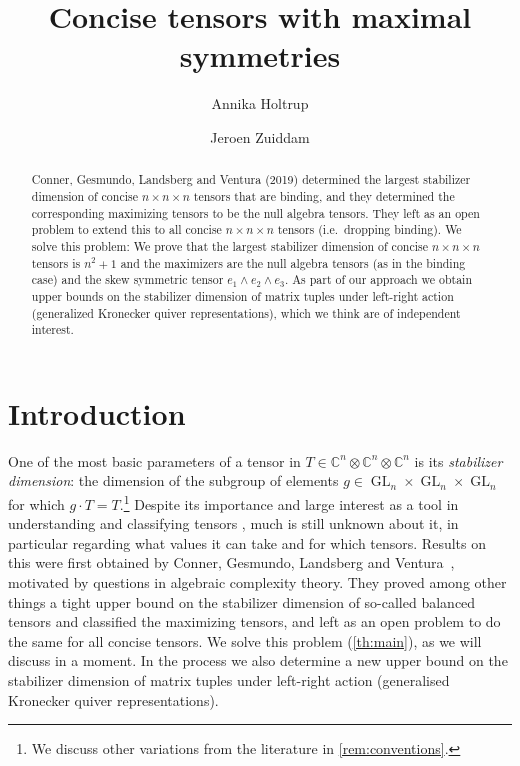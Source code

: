 \documentclass[11pt,a4paper]{article}
\title{Concise tensors with maximal symmetries}
\author{Annika Holtrup}
\author{Jeroen Zuiddam}
\affil{University of Amsterdam}
\date{}
\numberwithin{equation}{section}
\newcommand{\CC}{\mathbb{C}}
\DeclareMathOperator{\GL}{GL}
\begin{document}
\maketitle

\vspace{-2em}
\begin{abstract}
Conner, Gesmundo, Landsberg and Ventura (2019) determined the largest stabilizer  dimension of concise $n\times n \times n$ tensors that are binding, and they determined the corresponding maximizing tensors to be the null algebra tensors. They left as an open problem to extend this to all concise $n \times n \times n$ tensors (i.e.~dropping binding). We solve this problem: We prove that the largest stabilizer dimension of concise $n\times n\times n$ tensors is $n^2 + 1$ and the maximizers are the null algebra tensors (as in the binding case) and the skew symmetric tensor $e_1 \wedge e_2 \wedge e_3$. As part of our approach we obtain upper bounds on the stabilizer dimension of matrix tuples under left-right action (generalized Kronecker quiver representations), which we think are of independent interest.
\end{abstract}

%
 \tableofcontents
%

\section{Introduction}

One of the most basic parameters of a tensor in $T \in \CC^n \otimes \CC^n \otimes \CC^n$ is its \emph{stabilizer dimension}: the dimension of the subgroup of elements $g \in \GL_n \times \GL_n \times \GL_n$ for which $g\cdot T = T$.\footnote{We discuss other variations from the literature in \cref{rem:conventions}.} Despite its importance and large interest as a tool in understanding and classifying tensors \cite{MR506377, Burgisser1997Degen-6409, MR1781073, MR1773770, MR2932001, conner2021tensorsmaximalsymmetries, MR4204580, MR4644081, MR2865915}, much is still unknown about it, in particular regarding what values it can take and for which tensors. Results on this were first obtained by Conner,  Gesmundo, Landsberg and Ventura~\cite{conner2021tensorsmaximalsymmetries}, motivated by questions in algebraic complexity theory. They proved among other things a tight upper bound on the stabilizer dimension of so-called balanced tensors and classified the maximizing tensors, and left as an open problem to do the same for all concise tensors. We solve this problem (\cref{th:main}), as we will discuss in a moment. In the process we also determine a new upper bound on the stabilizer dimension of matrix tuples under left-right action (generalised Kronecker quiver representations).
\end{document}
